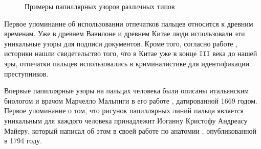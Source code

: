 \documentclass[14pt, a4paper]{extarticle}
\begin{document}
\begin{center}
	\begin{figure}[h!]
		\centering
		\hspace{0.05\textwidth}
		\hspace{0.05\textwidth}
		\caption{Примеры папиллярных узоров различных типов}
		\label{img:fingerprints}
	\end{figure}
\end{center}

\vspace{-1cm}

Первое упоминание об использовании отпечатков пальцев относится к древним временам. Уже в древнем Вавилоне и древнем Китае люди использовали эти уникальные узоры для подписи документов. Кроме того, согласно работе \cite{xiang1988historical}, историки нашли свидетельство того, что в Китае уже в конце \texttt{III} века до нашей эры, отпечатки пальцев использовались в криминалистике для идентификации преступников. 

Впервые папиллярные узоры на пальцах человека были описаны итальянским биологом и врачом Марчелло Мальпиги в его работе \cite{malpighi1669opera}, датированной 1669 годом. Первое упоминание о том, что рисунок папиллярных линий пальца является уникальным для каждого человека принадлежит Иоганну Кристофу Андреасу Майеру, который написал об этом в своей работе по анатомии \cite{mayer1794anatomische}, опубликованной в 1794 году. 
\end{document}
